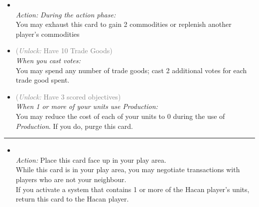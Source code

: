 \begin{multicols}{2}
\begin{itemize}
\item {}\\
\emph{Action:}
\emph{During the action phase:}\\
You may exhaust this card to gain 2 commodities or replenish another player's commodities
\item {} \textcolor{gray}{(\emph{Unlock:} Have 10 Trade Goods)}\\
\emph{When you cast votes:}
\\
You may spend any number of trade goods; cast 2 additional votes for each trade good spent. 
\item {} \textcolor{gray}{(\emph{Unlock:} Have 3 scored objectives)}\\
\emph{When 1 or more of your units use \emph{Production}:}\\
You may reduce the cost of each of your units to 0 during the use of \emph{Production}. If you do, purge this card. 
\end{itemize}

\vspace{-10pt}\rule{\hsize}{0.4pt}\vspace{5pt}


\begin{itemize}
\item {}\\
\emph{Action:} Place this card face up in your play area.\\
While this card is in your play area, you may negotiate transactions with players who are not your neighbour.\\
If you activate a system that contains 1 or more of the Hacan player's units, return this card to the Hacan player.
\end{itemize}

\end{multicols}



